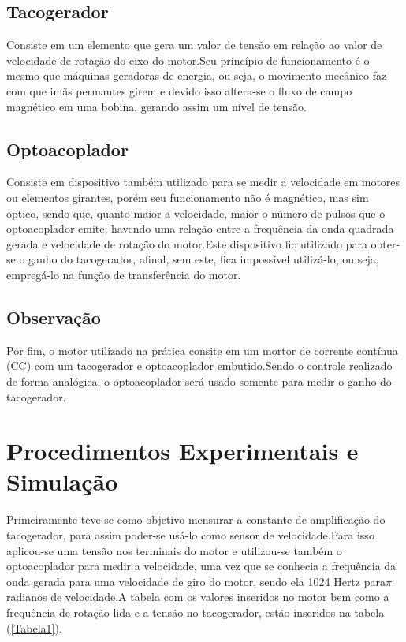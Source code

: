 \documentclass[11pt, a4paper, oneside]{article}
\begin{document}
\subsection{Tacogerador}
Consiste em um elemento que gera um valor de tensão em relação ao valor de velocidade de rotação do eixo do motor.Seu princípio de funcionamento é o mesmo que máquinas geradoras de energia, ou seja, o movimento mecânico faz com que imãs permantes girem e devido isso altera-se o fluxo de campo magnético em uma bobina, gerando assim um nível de tensão.
\subsection{Optoacoplador}
Consiste em dispositivo também utilizado para se medir a velocidade em motores ou elementos girantes, porém seu funcionamento não é magnético, mas sim optico, sendo que, quanto maior a velocidade, maior o número de pulsos que o optoacoplador emite, havendo uma relação entre a frequência da onda quadrada gerada e velocidade de rotação do motor.Este dispositivo fio utilizado para obter-se o ganho do tacogerador, afinal, sem este, fica impossível utilizá-lo, ou seja, empregá-lo na função de transferência do motor.
\subsection{Observação}
Por fim, o motor utilizado na prática consite em um mortor de corrente contínua (CC) com um tacogerador e optoacoplador embutido.Sendo o controle realizado de forma analógica, o optoacoplador será usado somente para medir o ganho do tacogerador.


\pagebreak

\section{Procedimentos Experimentais e Simulação}
Primeiramente teve-se como objetivo mensurar a constante de amplificação do tacogerador, para assim poder-se usá-lo como sensor de velocidade.Para isso aplicou-se uma tensão nos terminais do motor e utilizou-se também o optoacoplador para medir a velocidade, uma vez que se conhecia a frequência da onda gerada para uma velocidade de giro do motor, sendo ela 1024 Hertz para$ \pi$ radianos de velocidade.A tabela com os valores inseridos no motor bem como a frequência de rotação lida e a tensão no tacogerador, estão inseridos na tabela (\ref{Tabela1}).
\end{document}
